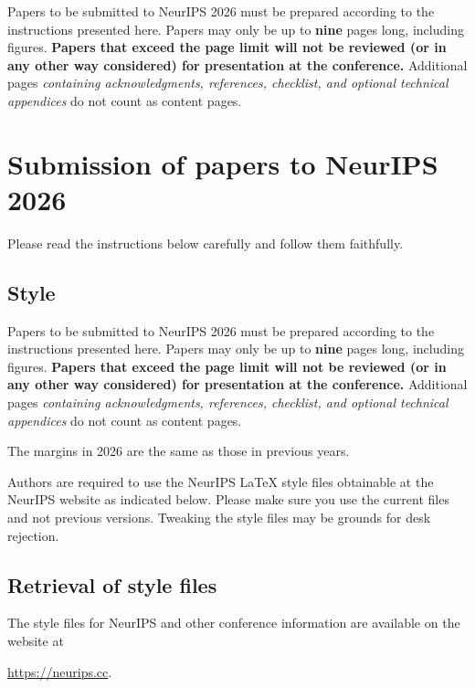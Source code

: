 \documentclass{article}
\begin{document}
Papers to be submitted to NeurIPS 2026 must be prepared according to the
instructions presented here. Papers may only be up to {\bf nine} pages long, including figures. \textbf{Papers that exceed the page limit will not be reviewed (or in any other way considered) for presentation at the conference.}
Additional pages \emph{containing acknowledgments, references, checklist, and optional technical appendices} do not count as content pages. 



\section{Submission of papers to NeurIPS 2026}


Please read the instructions below carefully and follow them faithfully.


\subsection{Style}


Papers to be submitted to NeurIPS 2026 must be prepared according to the
instructions presented here. Papers may only be up to {\bf nine} pages long, including figures. \textbf{Papers that exceed the page limit will not be reviewed (or in any other way considered) for presentation at the conference.}
Additional pages \emph{containing acknowledgments, references, checklist, and optional technical appendices} do not count as content pages. 


The margins in 2026 are the same as those in previous years.


Authors are required to use the NeurIPS \LaTeX{} style files obtainable at the NeurIPS website as indicated below. Please make sure you use the current files and not previous versions. Tweaking the style files may be grounds for desk rejection.


\subsection{Retrieval of style files}


The style files for NeurIPS and other conference information are available on the website at
\begin{center}
  \url{https://neurips.cc}.
\end{center}
\end{document}
